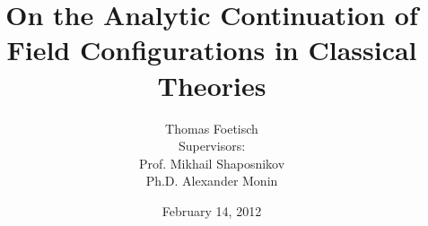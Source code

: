 \documentclass[]{beamer}
\title[Analytic Continuation of Field Configurations]{On the Analytic Continuation of Field Configurations in Classical Theories}
\author{Thomas Foetisch\\
Supervisors: \parbox[t]{5cm}{Prof. Mikhail Shaposnikov\\ Ph.D. Alexander Monin}}
\date{February 14, 2012}
\begin{document}
\begin{frame}
  \titlepage
\end{frame}

\end{document}
